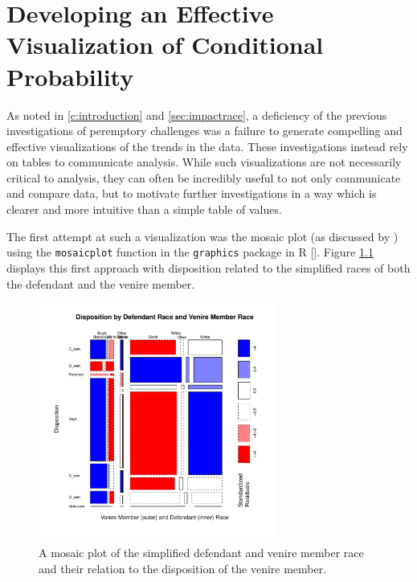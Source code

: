 \chapter{Developing an Effective Visualization of Conditional Probability} \label{app:devmob}

As noted in \ref{c:introduction} and \ref{sec:impactrace}, a
deficiency of the previous investigations of peremptory challenges
was a failure to generate compelling and effective visualizations of
the trends in the data. These investigations instead rely on tables to
communicate analysis. While such visualizations are not necessarily critical to analysis, they can often be incredibly useful to not only
communicate and compare data, but to motivate further investigations in a way which is clearer and more intuitive than
a simple table of values.

The first attempt at such a visualization was the mosaic plot (as discussed by \cite{friendly1994}) using the \texttt{mosaicplot}
function in the \texttt{graphics} package in R [\cite{Rcite}]. Figure \ref{fig:mosaicdefrace} displays this first approach with
disposition related to the simplified races of both the defendant and the venire member.

\begin{figure}[!h]
  \centering
  \includegraphics[width=0.7\textwidth]{Pictures/FirstMosaic}
  \caption[Mosaic Plot of Defendant and Venire Member
  Race]{\footnotesize A mosaic plot of the simplified defendant and venire member race and
    their relation to the disposition of the venire member.}
  \label{fig:mosaicdefrace}
\end{figure}

